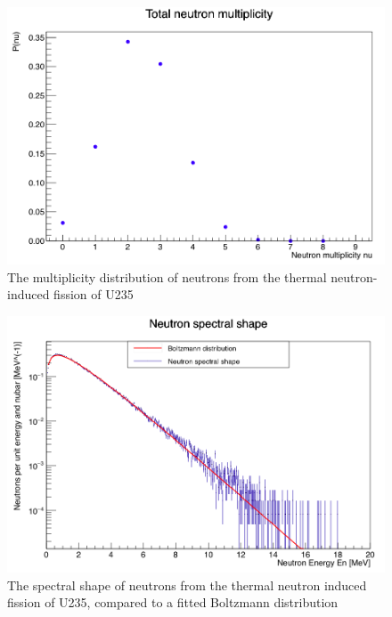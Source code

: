 \documentclass[]{article}
\begin{document}
\begin{figure} [H]
	\centering
	\includegraphics[scale=0.36]{U235_n_mult.png}
	\caption{The multiplicity distribution of neutrons from the thermal neutron-induced fission of U235}
	\label{fig:U235_n_mult}
\end{figure}

\begin{figure} [H]
	\centering
	\includegraphics[scale=0.36]{U235_n_spectral_shape.png}
	\caption{The spectral shape of neutrons from the thermal neutron induced fission of U235, compared to a fitted Boltzmann distribution}
	\label{fig:U235_n_spectral_shape}
\end{figure}
\end{document}
